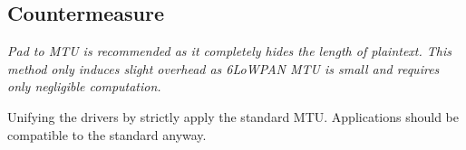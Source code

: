 \subsection{Countermeasure}
{\it
Pad to MTU is recommended as it completely hides the length of plaintext. This method only induces slight overhead as 6LoWPAN MTU is small and requires only negligible computation.

Unifying the drivers by strictly apply the standard MTU. Applications should be compatible to the standard anyway. 
}
